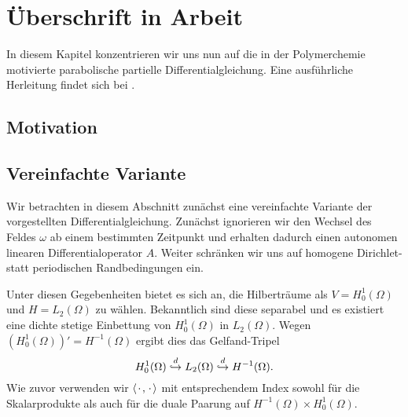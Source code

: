 
\chapter{Überschrift in Arbeit}


In diesem Kapitel konzentrieren wir uns nun auf die in der Polymerchemie motivierte parabolische partielle Differentialgleichung.
Eine ausführliche Herleitung findet sich bei \textcite{Fredrickson:2006th}.

\section{Motivation} %
\label{sec:motivation}



\section{Vereinfachte Variante} %
\label{sec:vereinfachte_variante}

Wir betrachten in diesem Abschnitt zunächst eine vereinfachte Variante der vorgestellten Differentialgleichung.
Zunächst ignorieren wir den Wechsel des Feldes $\omega$ ab einem bestimmten Zeitpunkt und erhalten dadurch einen autonomen linearen Differentialoperator $A$.
Weiter schränken wir uns auf homogene Dirichlet- statt periodischen Randbedingungen ein.

Unter diesen Gegebenheiten bietet es sich an, die Hilberträume als $V = H^{1}_{0}(\Omega)$ und $H = L_{2}(\Omega)$ zu wählen.
Bekanntlich sind diese separabel und es existiert eine dichte stetige Einbettung von $H^{1}_{0}(\Omega)$ in $L_{2}(\Omega)$.
Wegen $(H^{1}_{0}(\Omega))' = H^{-1}(\Omega)$ ergibt dies das Gelfand-Tripel
\begin{equation}
    H^{1}_{0}(\Omega) \stackrel{d}{\hookrightarrow} L_{2}(\Omega) \stackrel{d}{\hookrightarrow} H^{-1}(\Omega).
\end{equation}
Wie zuvor verwenden wir $\left\langle{\mkern2mu\cdot\mkern2mu},{\mkern2mu\cdot\mkern2mu}\right\rangle$ mit entsprechendem Index sowohl für die Skalarprodukte als auch für die duale Paarung auf $H^{-1}(\Omega) \times H^{1}_{0}(\Omega)$.

